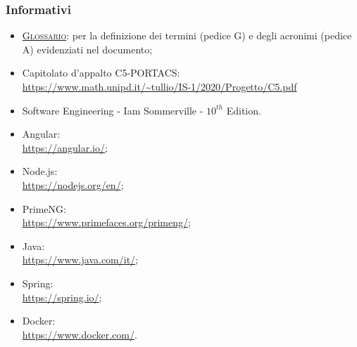     \subsubsection{Informativi}
\begin{itemize}
	\item \textsc{\href{https://github.com/Three-Way-Milkshake/docs/wiki/Glossario}{Glossario}}: per la definizione dei termini (pedice G) e degli acronimi (pedice A) evidenziati nel documento;
	\item Capitolato d'appalto C5-PORTACS: \\
{\url{https://www.math.unipd.it/~tullio/IS-1/2020/Progetto/C5.pdf}}
	\item Software Engineering - Iam Sommerville - $10^{th}$ Edition.
	\item Angular: \\ {\url{https://angular.io/}};
	\item Node.js: \\ {\url{https://nodejs.org/en/}};
	\item PrimeNG: \\ {\url{https://www.primefaces.org/primeng/}};
	\item Java: \\ {\url{https://www.java.com/it/}};
	\item Spring: \\ {\url{https://spring.io/}};
	\item Docker: \\ {\url{https://www.docker.com/}}.
	
\end{itemize}